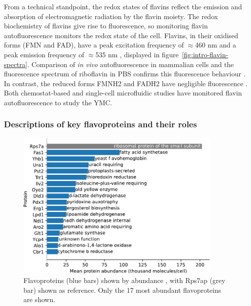 From a technical standpoint, the redox states of flavins reflect the emission and absorption of electromagnetic radiation by the flavin moiety.
The redox biochemistry of flavins give rise to fluorescence, so monitoring flavin autofluorescence monitors the redox state of the cell.
Flavins, in their oxidised forms (FMN and FAD), have a peak excitation frequency of $\approx$460 nm and a peak emission frequency of $\approx$535 nm \parencite{maslankaAutofluorescenceYeastSaccharomyces2018, wagnieresVivoFluorescenceSpectroscopy1998}, displayed in figure~\ref{fig:intro-flavin-spectra}.
Comparison of \emph{in vivo} autofluorescence in mammalian cells and the fluorescence spectrum of riboflavin in PBS confirms this fluorescence behaviour \parencite{aubinAutofluorescenceViableCultured1979}.
In contrast, the reduced forms FMNH2 and FADH2 have negligible fluorescence \parencite{mastersConfocalRedoxImaging1994}.
Both chemostat-based \parencite{sasidharanTimeStructureYeastMetabolism2012, murrayRedoxRegulationRespiring2011} and single-cell microfluidic studies \parencite{baumgartnerFlavinbasedMetabolicCycles2018} have monitored flavin autofluorescence to study the YMC.

\subsubsection{Descriptions of key flavoproteins and their roles}
\label{subsubsec:intro-flavin-biochem-descriptions}

\begin{figure}
  \centering
  \includegraphics[width=0.9\textwidth]{flavoprotein_abundance_bar}
  \caption{
    Flavoproteins (blue bars) shown by abundance \parencite{hoUnificationProteinAbundance2018}, with Rps7ap (grey bar) shown as reference.
    Only the 17 most abundant flavoproteins are shown.
    }
  \label{fig:intro-flavoprotein-abundance}
\end{figure}

